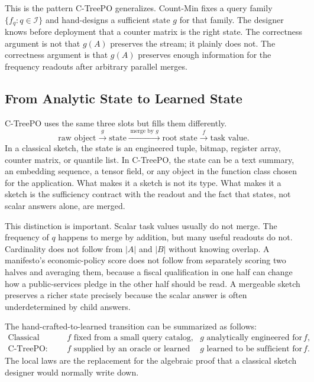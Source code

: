 This is the pattern C-TreePO generalizes. Count-Min fixes a query family
$\{f_q:q\in\mathcal I\}$ and hand-designs a sufficient state $g$ for that
family. The designer knows before deployment that a counter matrix is the
right state. The correctness argument is not that $g(A)$ preserves the stream;
it plainly does not. The correctness argument is that $g(A)$ preserves enough
information for the frequency readouts after arbitrary parallel merges.

\subsection{From Analytic State to Learned State}

C-TreePO uses the same three slots but fills them differently.
\[
  \text{raw object}
  \xrightarrow{\;g\;}
  \text{state}
  \xrightarrow{\;\text{merge by }g\;}
  \text{root state}
  \xrightarrow{\;f\;}
  \text{task value}.
\]
In a classical sketch, the state is an engineered tuple, bitmap, register
array, counter matrix, or quantile list. In C-TreePO, the state can be a text
summary, an embedding sequence, a tensor field, or any object in the function
class chosen for the application. What makes it a sketch is not its type. What
makes it a sketch is the sufficiency contract with the readout and the fact
that states, not scalar answers alone, are merged.

This distinction is important. Scalar task values usually do not merge. The
frequency of $q$ happens to merge by addition, but many useful readouts do
not. Cardinality does not follow from $|A|$ and $|B|$ without knowing overlap.
A manifesto's economic-policy score does not follow from separately scoring
two halves and averaging them, because a fiscal qualification in one half can
change how a public-services pledge in the other half should be read. A
mergeable sketch preserves a richer state precisely because the scalar answer
is often underdetermined by child answers.

The hand-crafted-to-learned transition can be summarized as follows:
\[
  \begin{array}{lll}
  \text{Classical sketch:}
    & f \text{ fixed from a small query catalog,}
    & g \text{ analytically engineered for } f,\\[2pt]
  \text{C-TreePO:}
    & f \text{ supplied by an oracle or learned readout,}
    & g \text{ learned to be sufficient for } f.
  \end{array}
\]
The local laws are the replacement for the algebraic proof that a classical
sketch designer would normally write down.

